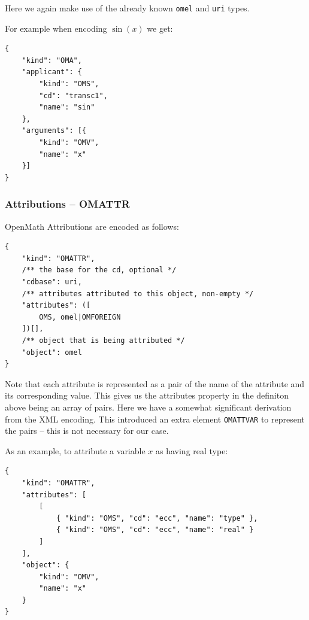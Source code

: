 Here we again make use of the already known \texttt{omel} and \texttt{uri} types. 

For example when encoding $\sin(x)$ we get:
\\\begin{minipage}{\linewidth}\begin{lstlisting}
{
    "kind": "OMA",
    "applicant": {
        "kind": "OMS",
        "cd": "transc1",
        "name": "sin"
    },
    "arguments": [{
        "kind": "OMV",
        "name": "x"
    }]
}
\end{lstlisting}\end{minipage}

\subsubsection{Attributions -- OMATTR}

OpenMath Attributions are encoded as follows:
\\\begin{minipage}{\linewidth}\begin{lstlisting}
{
    "kind": "OMATTR", 
    /** the base for the cd, optional */
    "cdbase": uri, 
    /** attributes attributed to this object, non-empty */
    "attributes": ([
        OMS, omel|OMFOREIGN
    ])[],
    /** object that is being attributed */
    "object": omel
}
\end{lstlisting}\end{minipage}

Note that each attribute is represented as a pair of the name of the attribute and its corresponding value. 
This gives us the attributes property in the definiton above being an array of pairs. 
Here we have a somewhat significant derivation from the XML encoding. 
This introduced an extra element \texttt{OMATTVAR} to represent the pairs -- this is not necessary for our case. 

As an example, to attribute a variable $x$ as having real type:
\\\begin{minipage}{\linewidth}\begin{lstlisting}
{
    "kind": "OMATTR",
    "attributes": [
        [
            { "kind": "OMS", "cd": "ecc", "name": "type" },
            { "kind": "OMS", "cd": "ecc", "name": "real" }
        ]
    ],
    "object": {
        "kind": "OMV",
        "name": "x"
    }
}
\end{lstlisting}\end{minipage}

